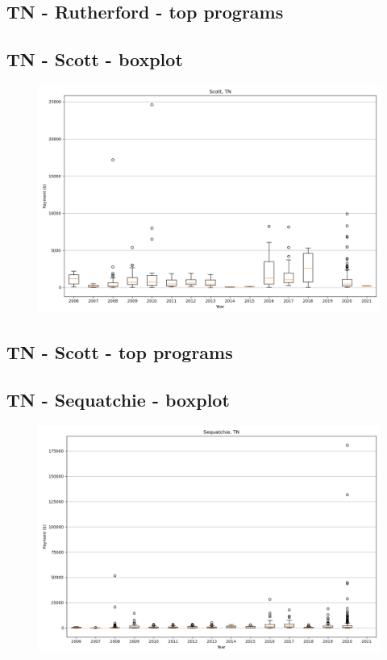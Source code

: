 \subsection*{TN - Rutherford - top programs}

\newpage
\subsection*{TN - Scott - boxplot}
\begin{figure}[h]
\centering
\includegraphics[width=7in]{../output/boxplots/counties/Scott-TN_boxplot.png}
\end{figure}


\subsection*{TN - Scott - top programs}

\newpage
\subsection*{TN - Sequatchie - boxplot}
\begin{figure}[h]
\centering
\includegraphics[width=7in]{../output/boxplots/counties/Sequatchie-TN_boxplot.png}
\end{figure}



